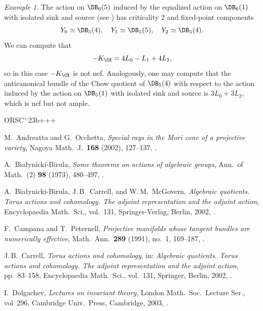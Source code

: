 \documentclass[11pt]{amsart}
\numberwithin{equation}{section}
\theoremstyle{definition}
\theoremstyle{remark}
\newtheorem{example}[theorem]{Example}
\begin{document}
\begin{example} The action on $\DB_6(5)$ induced by the equalized action on $\DB_6(1)$ with isolated sink and source (see \cite[Section~3.2]{FS}) has criticality $2$ and fixed-point components 
\[Y_0\simeq\DB_5(4),\quad Y_1\simeq\DB_5(5),\quad Y_2\simeq\DB_5(4).\]
We can compute that 
\[-K_{\CX}=4L_0 -L_1+4L_2,\]
so in this case $-K_{\CX}$ is not nef. Analogously, one may compute that the anticanonical bundle of the Chow quotient of $\DB_5(4)$ with respect to the action induced by the action on $\DB_5(1)$ with isolated sink and source  is $3L_0 +3L_2$, which is nef but not ample.
\end{example}



\newcommand{\etalchar}[1]{$^{#1}$}
\begin{thebibliography}{ORSC\etalchar{+}23b+++}

M.~Andreatta and G.~Occhetta, 
\emph{Special rays in the Mori cone of a projective variety}, 
Nagoya Math.~J.\ \textbf{168} (2002), 127--137,
.

A.~Bia{\l}ynicki-Birula, 
\emph{Some theorems on actions of algebraic groups},
Ann.\ of Math.~(2) \textbf{98} (1973), 480--497,
.

A.~Bia{\l}ynicki-Birula, J.\,B.~Carrell, and W.\,M.~McGovern, 
\emph{Algebraic quotients. Torus actions and cohomology. The
adjoint representation and the adjoint action}, Encyclopaedia Math.\ Sci.,
vol.~131, 
Springer-Verlag, Berlin, 2002,
.

F.~Campana and T.~Peternell, 
\emph{Projective manifolds whose tangent bundles are numerically effective}, 
Math.\ Ann.\ \textbf{289} (1991), no.~1, 169--187,
.

J.\,B.~Carrell, 
\emph{Torus actions and cohomology}, 
in: \emph{Algebraic quotients. Torus actions and cohomology. The
  adjoint representation and the adjoint action}, pp.~83--158,
Encyclopaedia Math.\ Sci., vol.~131, Springer, Berlin, 2002,
.

I.~Dolgachev, 
\emph{Lectures on invariant theory},
London Math.\ Soc.\ Lecture Ser., 
vol~296, 
Cambridge Univ.\ Press, Cambridge, 2003,
.


\end{thebibliography}
\end{document}
